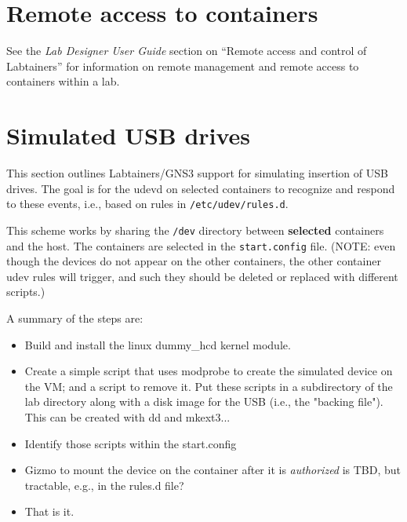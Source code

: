 \documentclass[12pt]{article}
\begin{document}
\section{Remote access to containers}
See the \textit{Lab Designer User Guide} section on ``Remote access and control of Labtainers'' for information 
on remote management and remote access to containers within a lab.

\section{Simulated USB drives}
This section outlines Labtainers/GNS3 support for simulating insertion of USB drives.  The goal is for the udevd on selected containers to
recognize and respond to these events, i.e., based on rules in {\tt /etc/udev/rules.d}.   

This scheme works by sharing the {\tt /dev} directory between \textbf{selected} containers and the host.  The containers are selected in the
{\tt start.config} file.  (NOTE: even though the devices do not appear on the other containers, the other container udev rules will trigger,
and such they should be deleted or replaced with different scripts.)


A summary of the steps are:
\begin{itemize}
\item Build and install the linux dummy\_hcd kernel module.
\item Create a simple script that uses modprobe to create the simulated device on the VM; and a script to remove it.  Put these scripts in a 
subdirectory of the lab directory along with a disk image for the USB (i.e., the "backing file").  This can be created with  dd and mkext3...
\item Identify those scripts within the start.config
\item Gizmo to mount the device on the container after it is \textit{authorized} is TBD, but tractable, e.g., in the rules.d file?
\item That is it.
\end{itemize}
\end{document}
